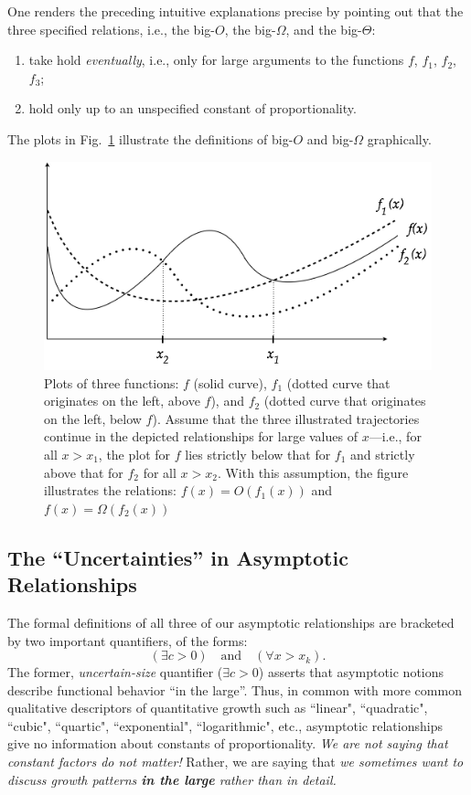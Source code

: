 One renders the preceding intuitive explanations precise by pointing out that the three specified relations, i.e., the big-$O$, the big-$\Omega$, and the big-$\Theta$:
\begin{enumerate}
\item
take hold {\em eventually}, i.e., only for large arguments to the functions $f$, $f_1$, $f_2$, $f_3$;
\medskip\item
hold only up to an unspecified constant of proportionality.
\end{enumerate}
The plots in Fig.~\ref{fig:Asymptotic} illustrate the definitions of big-$O$ and big-$\Omega$ graphically.
\begin{figure}[htb]
\begin{center}
       \includegraphics[scale=0.4]{FiguresArithmetic/NotationAsymptotic}
\caption{Plots of three functions: $f$ (solid curve), $f_1$ (dotted curve that originates on the left, above $f$), and $f_2$ (dotted curve that originates on the left, below $f$).  Assume that the three illustrated trajectories continue in the depicted relationships for large values of $x$---i.e., for all $x > x_1$, the plot for $f$ lies strictly below that for $f_1$ and strictly above that for $f_2$ for all $x > x_2$.  With this assumption, the figure illustrates the relations: $f(x) = O(f_1(x))$ and $f(x) = \Omega(f_2(x))$}
\label{fig:Asymptotic}
\end{center}
\end{figure}

\subsection{The ``Uncertainties'' in Asymptotic Relationships}
\label{sec:uncertainties-asymptotics}

The formal definitions of all three of our asymptotic relationships are bracketed by two important quantifiers, of the forms:
\[ 
(\exists c >0) \ \ \ \mbox{ and }  \ \ \  (\forall x > x_k).
\]
The former, {\em uncertain-size} quantifier ($\exists c >0$) asserts that asymptotic notions describe functional behavior ``in the large''.  Thus, in common with more common qualitative descriptors of quantitative growth such as ``linear", ``quadratic", ``cubic", ``quartic", ``exponential", ``logarithmic", etc., asymptotic relationships give no information about constants of proportionality.  {\em We are not saying that constant factors do not matter!}  Rather, we are saying that {\em we sometimes want to discuss growth patterns {\bf in the large} rather than in detail.}

